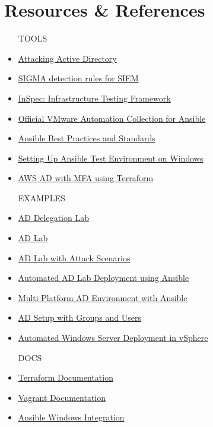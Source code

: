 \documentclass[11pt,a4paper]{article}
\begin{document}
\section{Resources \& References}
\begin{itemize}
    \item[TOOLS]
    \item \href{https://xapax.github.io/security/}{Attacking Active Directory}
    \item \href{https://github.com/mdecrevoisier/SIGMA-detection-rules}{SIGMA detection rules for SIEM}
    \item \href{https://github.com/inspec/inspec}{InSpec: Infrastructure Testing Framework}
    \item \href{https://github.com/ansible-collections/vmware.vmware}{Official VMware Automation Collection for Ansible}
    \item \href{https://spacelift.io/blog/ansible-best-practices}{Ansible Best Practices and Standards}
    \item \href{https://www.frostbyte.us/configure-an-ansible-testing-system-on-windows-part-1/}{Setting Up Ansible Test Environment on Windows}
    \item \href{https://github.com/guillermo-musumeci/terraform-aws-ad-mfa-radius-linotp}{AWS AD with MFA using Terraform}
    
    \item[EXAMPLES]
    \item \href{https://github.com/gr33nm0nk2802/DelegationLab?tab=readme-ov-file}{AD Delegation Lab}
    \item \href{https://github.com/alebov/AD-lab}{AD Lab}
    \item \href{https://github.com/jckhmr/adlab?tab=readme-ov-file}{AD Lab with Attack Scenarios}
    \item \href{https://github.com/C4l1b4n/Active-Directory-Ansible-Lab}{Automated AD Lab Deployment using Ansible}
    \item \href{https://github.com/blink-zero/ansible-ad-lab}{Multi-Platform AD Environment with Ansible}
    \item \href{https://github.com/ldelouw/active-directory-ansible-playbook}{AD Setup with Groups and Users}
    \item \href{https://github.com/Cinderblook/vSphere-WinServ-Deployment}{Automated Windows Server Deployment in vSphere}
    
    \item [DOCS]
    \item \href{https://www.terraform.io/docs/providers/aws/}{Terraform Documentation}
    \item \href{https://developer.hashicorp.com/vagrant/docs}{Vagrant Documentation}
    \item \href{https://docs.ansible.com/ansible/latest/os_guide/windows_usage.html}{Ansible Windows Integration}

\end{itemize}
\end{document}

